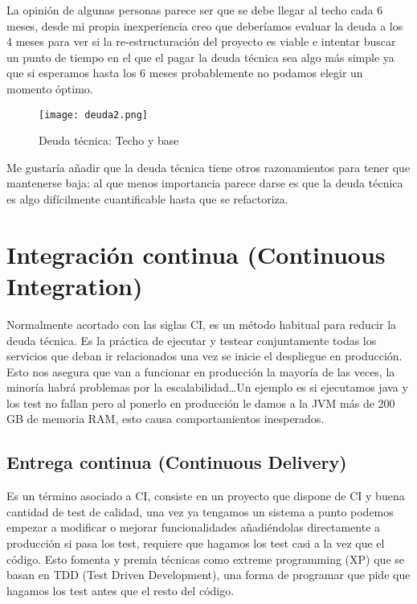 La opinión de algunas personas parece ser que se debe llegar al techo cada 6 meses, desde mi propia inexperiencia creo que deberíamos evaluar la deuda a los 4 meses para ver si la re-estructuración del proyecto es viable e intentar buscar un punto de tiempo en el que el pagar la deuda técnica sea algo más simple ya que si esperamos hasta los 6 meses probablemente no podamos elegir un momento óptimo. 

\begin{figure}
	\centering
	\texttt{[image: deuda2.png]}
	\caption{Deuda técnica: Techo y base}\label{fig:deuda2.png}
\end{figure}

Me gustaría añadir que la deuda técnica tiene otros razonamientos para tener que mantenerse baja: al que menos importancia parece darse es que la deuda técnica es algo difícilmente cuantificable hasta que se refactoriza.

\section{Integración continua (Continuous Integration)}

Normalmente acortado con las siglas CI, es un método habitual para reducir la deuda técnica. Es la práctica de ejecutar y testear conjuntamente todas los servicios que deban ir relacionados una vez se inicie el despliegue en producción. Esto nos asegura que van a funcionar en producción la mayoría de las veces, la minoría habrá problemas por la escalabilidad\ldots Un ejemplo es si ejecutamos java y los test no fallan pero al ponerlo en producción le damos a la JVM más de 200 GB de memoria RAM, esto causa comportamientos inesperados. 

\subsection{Entrega continua (Continuous Delivery)}

Es un término asociado a CI, consiste en un proyecto que dispone de CI y buena cantidad de test de calidad, una vez ya tengamos un sistema a punto podemos empezar a modificar o mejorar funcionalidades añadiéndolas directamente a producción si pasa los test, requiere que hagamos los test casi a la vez que el código. Esto fomenta y premia técnicas como extreme programming (XP) que se basan en TDD (Test Driven Development), una forma de programar que pide que hagamos los test antes que el resto del código.


